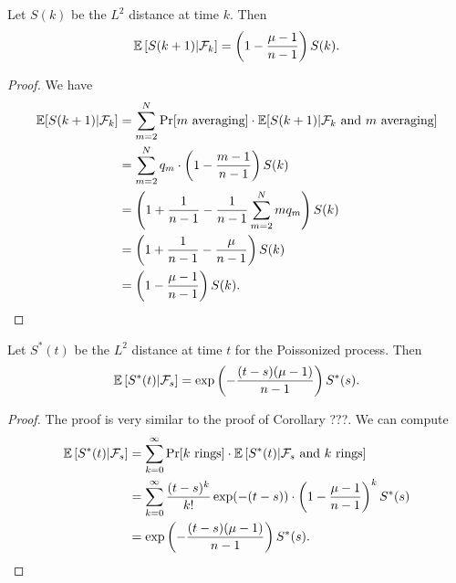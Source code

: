 \documentclass[12pt]{article}
\begin{document}
\begin{prop}
	Let $S(k)$ be the $L^2$ distance at time $k$. Then 
	\[
		\mathbb{E} \left [ S(k+1) | \mathcal{F}_k \right ] = \left ( 1 - \frac{\mu - 1}{n-1} \right ) S(k). 
	\]
\end{prop}
\begin{proof}
	We have 
	\begin{align*}
		\mathbb{E}[S(k+1) | \mathcal{F}_k] & = \sum_{m = 2}^N \Pr[m \text{ averaging}] \cdot \mathbb{E}[S(k+1) | \mathcal{F}_k \text{ and } m \text{ averaging}] \\
		& = \sum_{m = 2}^N q_m \cdot \left ( 1 - \frac{m -1}{n-1} \right ) S(k) \\
		& = \left ( 1 + \frac{1}{n-1} - \frac{1}{n-1} \sum_{m = 2}^N mq_m \right ) S(k) \\
		& = \left ( 1 + \frac{1}{n-1} - \frac{\mu}{n-1} \right ) S(k) \\
		& = \left ( 1 - \frac{\mu - 1}{n-1} \right ) S(k). 
	\end{align*}
\end{proof}

\begin{cor}
	Let $S^*(t)$ be the $L^2$ distance at time $t$ for the Poissonized process. Then 
	\[
		\mathbb{E} \left [ S^*(t) | \mathcal{F}_s \right ] = \exp \left ( - \frac{(t-s)(\mu - 1)}{n-1} \right ) S^*(s).
	\]
\end{cor}

\begin{proof}
	The proof is very similar to the proof of Corollary ???. We can compute 
	\begin{align*}
		\mathbb{E} \left [S^*(t) | \mathcal{F}_s \right ] & = \sum_{k = 0}^\infty \Pr[k \text{ rings}] \cdot \mathbb{E} \left [ S^*(t) | \mathcal{F}_s \text{ and } k \text{ rings} \right ] \\
		& = \sum_{k = 0}^\infty \frac{(t-s)^k}{k!} \exp (-(t-s)) \cdot \left ( 1 - \frac{\mu - 1}{n-1} \right )^k S^*(s) \\
		& = \exp \left ( - \frac{(t-s) (\mu - 1)}{n-1} \right ) S^*(s). 
	\end{align*}
\end{proof}
\end{document}
